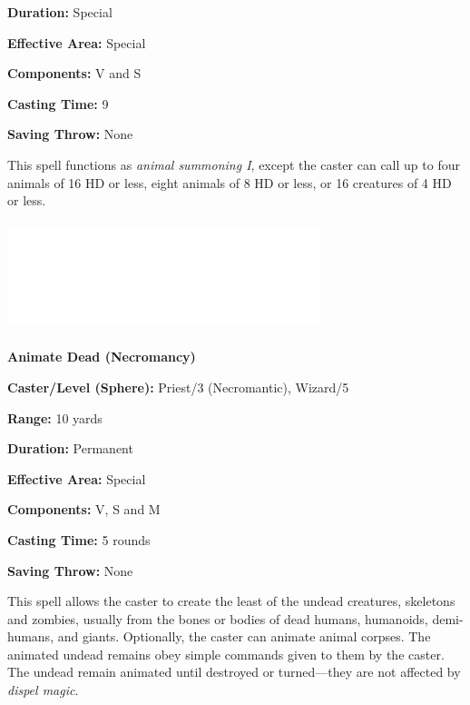 \begin{multicols}{2}
\begin{minipage}{\columnwidth}
\noindent \textbf{Duration:} Special

\noindent \textbf{Effective Area:} Special

\noindent \textbf{Components:} V and S

\noindent \textbf{Casting Time:} 9

\noindent \textbf{Saving Throw:} None

\end{minipage}

This spell functions as \textit{animal summoning I}, except the caster can call up to four animals of 16 HD or less, eight animals of 8 HD or less, or 16 creatures of 4 HD or less. 

\noindent\includegraphics[width=3.6in, height=1.25in]{testblock.pdf}  

\vspace{1em}

\noindent
\begin{minipage}{\columnwidth}

\noindent \textbf{Animate Dead (Necromancy)}

\noindent \textbf{Caster/Level (Sphere):} Priest/3 (Necromantic), Wizard/5

\noindent \textbf{Range:} 10 yards

\noindent \textbf{Duration:} Permanent

\noindent \textbf{Effective Area:} Special

\noindent \textbf{Components:} V, S and M

\noindent \textbf{Casting Time:} 5 rounds 

\noindent \textbf{Saving Throw:} None

\end{minipage}

This spell allows the caster to create the least of the undead creatures, skeletons and zombies, usually from the bones or bodies of dead humans, humanoids, demi-humans, and giants.  Optionally, the caster can animate animal corpses. The animated undead remains obey simple commands given to them by the caster.  The undead remain animated until destroyed or turned---they are not affected by \textit{dispel magic}.


\end{multicols}
